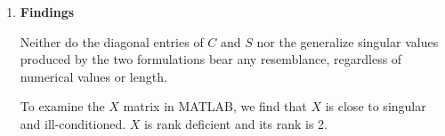 \begin{enumerate}[(1).]
        \item \textbf{Findings}
            
            Neither do the diagonal entries of $C$ and $S$ nor the generalize singular values produced by the two formulations bear any resemblance, regardless of numerical values or length.
            
            To examine the $X$ matrix in MATLAB, we find that $X$ is close to singular and ill-conditioned. $X$ is rank deficient and its rank is 2.
            
    \end{enumerate}









